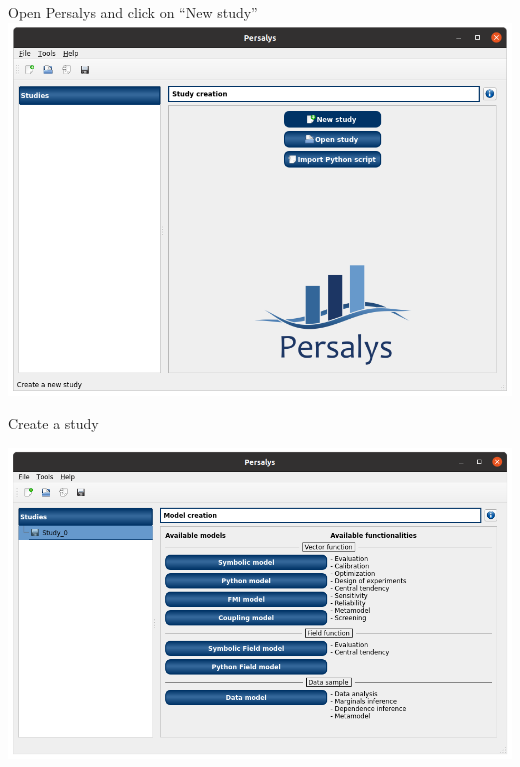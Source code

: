 \documentclass{beamer}
\begin{document}
  \begin{frame}{Open Persalys and click on ``New study''}
    \centering
    \includegraphics[width=.89\textwidth]{figure/Persalys_GUI.png}
    \end{frame}
    
    \begin{frame}{Create a study}
    
    \includegraphics[width=\textwidth]{figure/Persalys_new_study.png}
    \end{frame}
    
\end{document}
